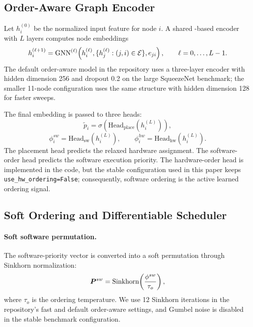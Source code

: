 \subsection{Order-Aware Graph Encoder}
Let $h_i^{(0)}$ be the normalized input feature for node $i$. A shared \gcn-based encoder with $L$ layers computes node embeddings
\begin{equation}
h_i^{(\ell+1)}=
\mathrm{GNN}^{(\ell)}\!\left(
h_i^{(\ell)},
\{h_j^{(\ell)}:(j,i)\in\mathcal{E}\},
e_{ji}
\right),
\qquad \ell=0,\dots,L-1.
\end{equation}
The default order-aware model in the repository uses a three-layer encoder with hidden dimension 256 and dropout 0.2 on the large SqueezeNet benchmark; the smaller 11-node configuration uses the same structure with hidden dimension 128 for faster sweeps.

The final embedding is passed to three heads:
\begin{equation}
\tilde{p}_i = \sigma\!\left(\mathrm{Head}_{\mathrm{place}}(h_i^{(L)})\right),
\end{equation}
\begin{equation}
\phi_i^{sw} = \mathrm{Head}_{\mathrm{sw}}(h_i^{(L)}),
\qquad
\phi_i^{hw} = \mathrm{Head}_{\mathrm{hw}}(h_i^{(L)}).
\end{equation}
The placement head predicts the relaxed hardware assignment. The software-order head predicts the software execution priority. The hardware-order head is implemented in the code, but the stable configuration used in this paper keeps \texttt{use\_hw\_ordering=False}; consequently, software ordering is the active learned ordering signal.

\subsection{Soft Ordering and Differentiable Scheduler}
\paragraph{Soft software permutation.}
The software-priority vector is converted into a soft permutation through Sinkhorn normalization:
\begin{equation}
\bm{P}^{sw}=\mathrm{Sinkhorn}\!\left(\frac{\phi^{sw}}{\tau_o}\right),
\label{eq:sinkhorn_sw}
\end{equation}
where $\tau_o$ is the ordering temperature. We use 12 Sinkhorn iterations in the repository's fast and default order-aware settings, and Gumbel noise is disabled in the stable benchmark configuration.

